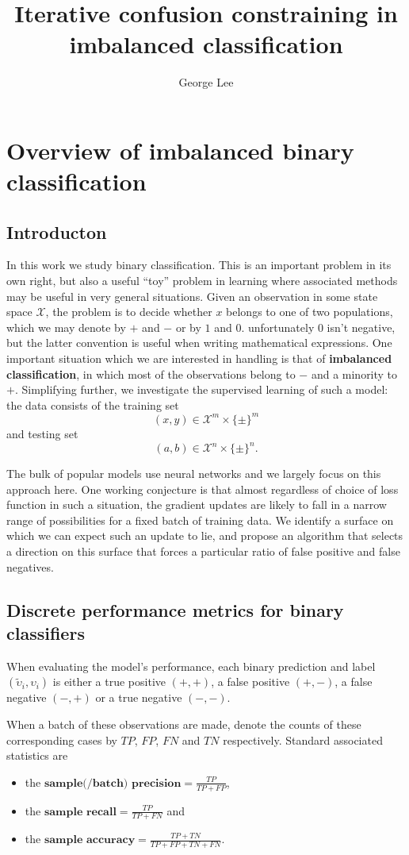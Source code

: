 \documentclass[10pt,a4paper]{article}
\title{Iterative confusion constraining in imbalanced classification}
\author{George Lee}
\begin{document}
\maketitle
\section{Overview of imbalanced binary classification}
\subsection{Introducton}
In this work we study binary classification.
This is an important problem in its own right, but also a useful ``toy'' problem in learning where associated methods may be useful in very general situations.
Given an observation in some state space $\mathcal X$, the problem is to decide whether $x$ belongs to one of two populations, which we may denote by $+$ and $-$ or by $1$ and $0$.
unfortunately 0 isn't negative, but the latter convention is useful when writing mathematical expressions.
One important situation which we are interested in handling is that of \textbf{imbalanced classification}, in which most of the observations belong to $-$ and a minority to $+$.
Simplifying further, we investigate the supervised learning of such a model: the data consists of the training set
$$
(x,y)\in\mathcal X^m\times\{\pm\}^m
$$
and testing set
$$
(a,b)\in\mathcal X^n\times\{\pm\}^n.
$$

The bulk of popular models use neural networks and we largely focus on this approach here.
One working conjecture is that almost regardless of choice of loss function in such a situation, the gradient updates are likely to fall in a narrow range of possibilities for a fixed batch of training data.
We identify a surface on which we can expect such an update to lie, and propose an algorithm that selects a direction on this surface that forces a particular ratio of false positive and false negatives.
\subsection{Discrete performance metrics for binary classifiers}
When evaluating the model's performance, each binary prediction and label $(\widetilde\upsilon_i,\upsilon_i)$ is either a true positive $(+,+)$, a false positive $(+,-)$, a false negative $(-,+)$ or a true negative $(-,-)$.

When a batch of these observations are made, denote the counts of these corresponding cases by $TP$, $FP$, $FN$ and $TN$ respectively.
Standard associated statistics are
\begin{itemize}
  \item the $\textbf{sample(/batch) precision}=\frac{TP}{TP+FP}$,
  \item the $\textbf{sample recall}=\frac{TP}{TP+FN}$ and
  \item the $\textbf{sample accuracy}=\frac{TP+TN}{TP+FP+TN+FN}$.
\end{itemize}
\end{document}
